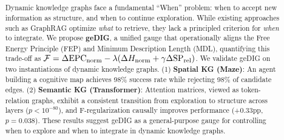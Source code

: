 
\title{
}


\author{%
}


\begin{abstract}
Dynamic knowledge graphs face a fundamental ``When'' problem: when to accept new information as structure, and when to continue exploration. While existing approaches such as GraphRAG optimize \emph{what} to retrieve, they lack a principled criterion for \emph{when} to integrate. We propose \textbf{geDIG}, a unified gauge that operationally aligns the Free Energy Principle (FEP) and Minimum Description Length (MDL), quantifying this trade-off as $\mathcal{F} = \Delta\mathrm{EPC}_{\mathrm{norm}} - \lambda(\Delta H_{\mathrm{norm}} + \gamma \Delta \mathrm{SP}_{\mathrm{rel}})$. We validate geDIG on two instantiations of dynamic knowledge graphs. (1) \textbf{Spatial KG (Maze)}: An agent building a cognitive map achieves 98\% success rate while rejecting 98\% of candidate edges. (2) \textbf{Semantic KG (Transformer)}: Attention matrices, viewed as token-relation graphs, exhibit a consistent transition from exploration to structure across layers ($p < 10^{-80}$), and F-regularization causally improves performance (+0.33pp, $p=0.038$). These results suggest geDIG as a general-purpose gauge for controlling when to explore and when to integrate in dynamic knowledge graphs.
\end{abstract}


\begingroup
\setlength{\tabcolsep}{0pt}
\maketitle
\endgroup

